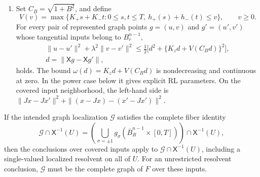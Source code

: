 \begin{theorem}
\begin{enumerate}
\(\mathsf X\) has no collisions: equal inputs imply equal graph points.
At the seam, the two parameter representations describe the same graph
point, not two different solutions.
\item Set \(C_B=\sqrt{1+B^2}\), and define
\[
 V(v)=\max\{K_+s+K_-t:0\le s,t\le T,
                         \ h_+(s)+h_-(t)\le v\},\qquad v\ge0.
 \tag{S8}\label{eq:schur-allocation}
\]
For every pair of represented graph points \(g=(u,v)\) and
\(g'=(u',v')\) whose tangential inputs belong to \(B_r^{n-1}\),
\[
 \begin{gathered}
 \|u-u'\|^2+\lambda^2\|v-v'\|^2
 \le\frac12\bigl[d^2+\{K_zd+V(C_Bd)\}^2\bigr],\\
 d=\|\mathsf Xg-\mathsf Xg'\|,
 \end{gathered}
 \tag{S9}\label{eq:schur-RL-gauge}
\]
holds.  The bound \(\omega(d)=K_zd+V(C_Bd)\) is nondecreasing and
continuous at zero.  In the power case below it gives explicit RL
parameters.  On the covered input neighborhood, the left-hand side is
\(\|Jx-Jx'\|^2+\|(x-Jx)-(x'-Jx')\|^2\).
\end{enumerate}
If the intended graph localization \(\mathcal G\) satisfies the complete
fiber identity
\[
 \mathcal G\cap\mathsf X^{-1}(U)
 =\left(\bigcup_{\sigma=\pm1}
    g_\sigma(\overline B_R^{n-1}\times[0,T])\right)
      \cap\mathsf X^{-1}(U),
 \tag{S10}\label{eq:schur-complete-fibers}
\]
then the conclusions over covered inputs apply to
\(\mathcal G\cap\mathsf X^{-1}(U)\), including a
single-valued localized resolvent on all of \(U\).  For an unrestricted
resolvent conclusion, \(\mathcal G\) must be the complete graph of \(F\)
over these inputs.
\end{theorem}

